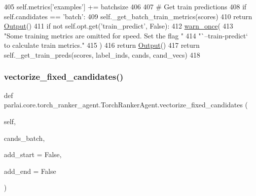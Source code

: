 \begin{DoxyCode}
405         self.metrics[\textcolor{stringliteral}{'examples'}] += batchsize
406 
407         \textcolor{comment}{# Get train predictions}
408         \textcolor{keywordflow}{if} self.candidates == \textcolor{stringliteral}{'batch'}:
409             self.\_get\_batch\_train\_metrics(scores)
410             \textcolor{keywordflow}{return} \hyperlink{namespaceparlai_1_1agents_1_1legacy__agents_1_1seq2seq_1_1torch__agent__v1_a2689006ea97d09413fb242f984bd8016}{Output}()
411         \textcolor{keywordflow}{if} \textcolor{keywordflow}{not} self.opt.get(\textcolor{stringliteral}{'train\_predict'}, \textcolor{keyword}{False}):
412             \hyperlink{namespaceparlai_1_1utils_1_1misc_a884a3aefa90581f53bc592fa6a78dc43}{warn\_once}(
413                 \textcolor{stringliteral}{"Some training metrics are omitted for speed. Set the flag "}
414                 \textcolor{stringliteral}{"`--train-predict` to calculate train metrics."}
415             )
416             \textcolor{keywordflow}{return} \hyperlink{namespaceparlai_1_1agents_1_1legacy__agents_1_1seq2seq_1_1torch__agent__v1_a2689006ea97d09413fb242f984bd8016}{Output}()
417         \textcolor{keywordflow}{return} self.\_get\_train\_preds(scores, label\_inds, cands, cand\_vecs)
418 
\end{DoxyCode}
\mbox{\label{classparlai_1_1core_1_1torch__ranker__agent_1_1TorchRankerAgent_af2e2d618f056bb68089c7252fa07d07b}} 
\subsubsection{\texorpdfstring{vectorize\+\_\+fixed\+\_\+candidates()}{vectorize\_fixed\_candidates()}}
{\footnotesize\ttfamily def parlai.\+core.\+torch\+\_\+ranker\+\_\+agent.\+Torch\+Ranker\+Agent.\+vectorize\+\_\+fixed\+\_\+candidates (\begin{DoxyParamCaption}\item[{}]{self,  }\item[{}]{cands\+\_\+batch,  }\item[{}]{add\+\_\+start = {\ttfamily False},  }\item[{}]{add\+\_\+end = {\ttfamily False} }\end{DoxyParamCaption})}

